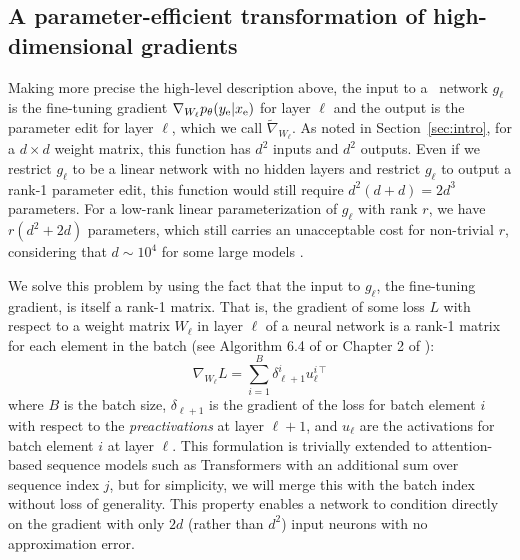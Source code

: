 \documentclass{article}
\begin{document}
\subsection{A parameter-efficient transformation of high-dimensional gradients}



Making more precise the high-level description above, the input to a \name~network $g_\ell$ is the fine-tuning gradient $\nabla_{W_\ell} p_\theta(y_\text{e}|x_\text{e})$ for layer $\ell$ and the output is the parameter edit for layer $\ell$, which we call $\tilde\nabla_{W_\ell}$. As noted in Section~\ref{sec:intro}, for a $d \times d$ weight matrix, this function has $d^2$ inputs and $d^2$ outputs. Even if we restrict $g_\ell$ to be a linear network with no hidden layers and restrict $g_\ell$ to output a rank-1 parameter edit, this function would still require $d^2(d+d) = 2d^3$ parameters. For a low-rank linear parameterization of $g_\ell$ with rank $r$, we have $r(d^2 + 2d)$ parameters, which still carries an unacceptable cost for non-trivial $r$, considering that $d\sim 10^4$ for some large models \citep{radford2019language,2020t5}.

We solve this problem by using the fact that the input to $g_\ell$, the fine-tuning gradient, is itself a rank-1 matrix. That is, the gradient of some loss $L$ with respect to a weight matrix $W_{\ell}$ in layer $\ell$ of a neural network is a rank-1 matrix for each element in the batch (see Algorithm 6.4 of \citealp{Goodfellow-et-al-2016} or Chapter 2 of \citealp{nielsen2015neural}):
\begin{equation}
    \nabla_{W_\ell}L = \sum_{i=1}^B\delta_{\ell + 1}^i{u_\ell^{i\,\top}}
\end{equation}
where $B$ is the batch size, $\delta_{\ell+1}$ is the gradient of the loss for batch element $i$ with respect to the \textit{preactivations} at layer $\ell+1$, and $u_\ell$ are the activations for batch element $i$ at layer $\ell$. This formulation is trivially extended to attention-based sequence models such as Transformers \citep{vaswani2017attention,radford2019language} with an additional sum over sequence index $j$, but for simplicity, we will merge this with the batch index without loss of generality. This property enables a network to condition directly on the gradient with only $2d$ (rather than $d^2$) input neurons with no approximation error.
\end{document}
